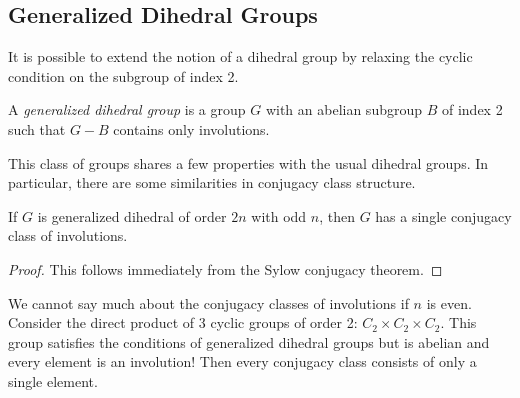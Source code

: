 \documentclass[main.tex]{subfiles}
\begin{document}
\subsection{Generalized Dihedral Groups}

It is possible to extend the notion of a dihedral group by relaxing the cyclic condition on the subgroup of index 2.

\begin{definition}
A \emph{generalized dihedral group} is a group $G$ with an abelian subgroup $B$ of index 2 such that $G - B$ contains only involutions.
\end{definition}

This class of groups shares a few properties with the usual dihedral groups. In particular, there are some similarities in conjugacy class structure.

\begin{proposition}
If $G$ is generalized dihedral of order $2n$ with odd $n$, then $G$ has a single conjugacy class of involutions.
\end{proposition}

\begin{proof}
This follows immediately from the Sylow conjugacy theorem.
\end{proof}

We cannot say much about the conjugacy classes of involutions if $n$ is even. Consider the direct product of 3 cyclic groups of order 2: $C_2 \times C_2 \times C_2$. This group satisfies the conditions of generalized dihedral groups but is abelian and every element is an involution! Then every conjugacy class consists of only a single element.
\end{document}
